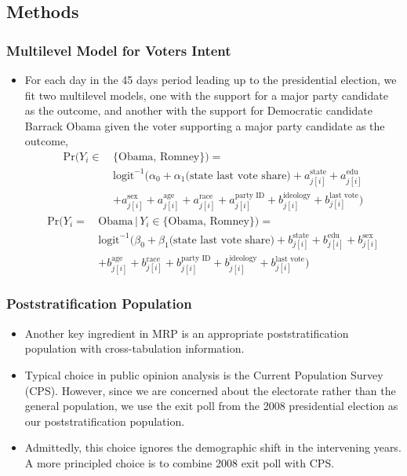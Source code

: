 \documentclass[xetex,mathserif,serif]{beamer}
\begin{document}
\subsection{Methods}
\begin{frame}
  \frametitle{Multilevel Model for Voters Intent}
  \begin{itemize}
  \item For each day in the 45 days period leading up to the presidential
    election, we fit two multilevel models, one with the support for a major
    party candidate as the outcome, and another with the support for Democratic
    candidate Barrack Obama given the voter supporting a major party candidate as
    the outcome,
    \footnotesize{
      \begin{align*}
        \text{Pr}(Y_i \in \, &\{\text{Obama, Romney}\})=\\
        &\text{logit}^{-1}\big(\alpha_0+  \alpha_1\text{(state last vote share)} 
        + a^{\text{state}}_{j[i]}+a^{\text{edu}}_{j[i]}\\
        &+a^{\text{sex}}_{j[i]}+a^{\text{age}}_{j[i]}
        +a^{\text{race}}_{j[i]}+a^{\text{party ID}}_{j[i]}
        +b^{\text{ideology}}_{j[i]} + b^{\text{last vote}}_{j[i]} \big)
      \end{align*}
      \begin{align*}
        \text{Pr}(Y_i = \, &\text{Obama} \, |\, Y_i\in\{\text{Obama, Romney}\})=\\
        &\text{logit}^{-1}\big(\beta_0+ \beta_1\text{(state last vote share)} +
        b^{\text{state}}_{j[i]}+b^{\text{edu}}_{j[i]}+b^{\text{sex}}_{j[i]}\\
        &+b^{\text{age}}_{j[i]} +b^{\text{race}}_{j[i]}+b^{\text{party
            ID}}_{j[i]} + b^{\text{ideology}}_{j[i]} + b^{\text{last
            vote}}_{j[i]} \big)
      \end{align*}
    }
  \end{itemize}
\end{frame}
\begin{frame}
  \frametitle{Poststratification Population}
  \begin{itemize}
  \item Another key ingredient in MRP is an appropriate poststratification
    population with cross-tabulation information.
  \item Typical choice in public opinion analysis is the Current Population
    Survey (CPS). However, since we are concerned about the electorate rather
    than the general population, we use the exit poll from the 2008 presidential
    election as our poststratification population.
  \item Admittedly, this choice ignores the demographic shift in the intervening
    years. A more principled choice is to combine 2008 exit poll with CPS.
  \end{itemize}
\end{frame}
\end{document}

